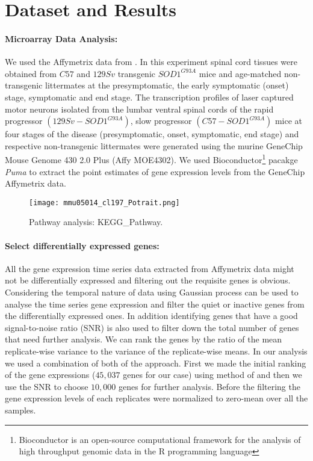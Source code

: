 \section{Dataset and Results}

\paragraph{Microarray Data Analysis:}
We used the Affymetrix data from \cite{Nardo:2013}.  In this
experiment spinal cord tissues were obtained from $C57$ and $129Sv$
transgenic $SOD1^{G93A}$ mice and age-matched non-transgenic
littermates at the presymptomatic, the early symptomatic (onset)
stage, symptomatic and end stage.  The transcription profiles of laser
captured motor neurons isolated from the lumbar ventral spinal cords
of the rapid progressor $(129Sv-SOD1^{G93A})$, slow progressor
$(C57-SOD1^{G93A})$ mice at four stages of the disease
(presymptomatic, onset, symptomatic, end stage) and respective
non-transgenic littermates were generated using the murine GeneChip
Mouse Genome 430 2.0 Plus (Affy MOE4302).  We used
Bioconductor\footnote{Bioconductor is an open-source computational
  framework for the analysis of high throughput genomic data in the
  R programming language} pacakge \emph{Puma} \cite{puma} to extract the
point estimates of gene expression levels from the GeneChip Affymetrix
data.

\begin{figure}
 \begin{center}
 \texttt{[image: mmu05014\_cl197\_Potrait.png]}
\caption {Pathway analysis: KEGG\_Pathway. \label{pathwayAnalysis}}
 \end{center}
\end{figure}

\paragraph{Select differentially expressed genes:}
All the gene expression time series data extracted from Affymetrix
data might not be differentially expressed and filtering out the
requisite genes is obvious. Considering the temporal nature of data
using Gaussian process \cite{Kalaitzis:2011} can be used to analyse
the time series gene expression and filter the quiet or inactive genes
from the differentially expressed ones.  In addition identifying genes
that have a good signal-to-noise ratio (SNR) is also used to filter
down the total number of genes that need further analysis. We can rank
the genes by the ratio of the mean replicate-wise variance to the
variance of the replicate-wise means. In our analysis we used a
combination of both of the approach.  First we made the initial
ranking of the gene expressions ($45,037$ genes for our case) using
method of \cite{Kalaitzis:2011} and then we use the SNR to choose
$10,000$ genes for further analysis.  Before the filtering the gene
expression levels of each replicates were normalized to zero-mean over
all the samples.

